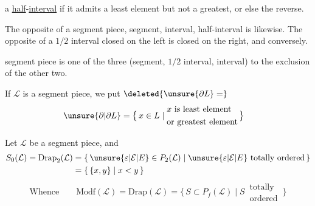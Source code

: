 a \uline{half}-\uline{interval} if it admits a least element but not a greatest, or else the reverse.

 The opposite of a segment piece, segment, interval, half-interval is likewise. The opposite of a $1/2$ interval closed on the left is closed on the right, and conversely.

 segment piece is one of the three (segment, $1/2$ interval, interval) to the exclusion of the other two.

If $\mathcal L$ is a segment piece, we put $\deleted{\unsure{\partial L}=}$
\[
\begin{aligned}
\unsure{\partial|\partial L}&=\bigl\{\,x\in L\mid
\begin{aligned}&x\text{ is least element}\\
&\text{or greatest element}\end{aligned}\,\bigr\}
\end{aligned}
\]

Let $\mathcal L$ be a segment piece, and
\[
\begin{aligned}
S_0(\mathcal L)=\mathrm{Drap}_2(\mathcal L)&=\{\,\unsure{\varepsilon|\mathcal E|E}\in P_2(\mathcal L)\mid \unsure{\varepsilon|\mathcal E|E}\text{ totally ordered}\,\}\\
&=\{\,\{x,y\}\mid x<y\,\}
\end{aligned}
\]
\[
\text{Whence}\qquad \mathrm{Modf}(\mathcal L)=\mathrm{Drap}(\mathcal L)
=\{\,S\subset P_f(\mathcal L)\mid S\,\substack{\text{totally}\\\text{ordered}}\,\}
\]

